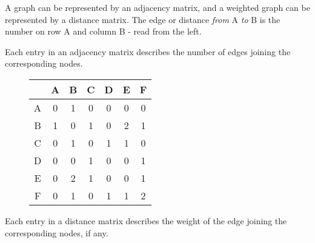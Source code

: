 \documentclass[../main.tex]{subfile}
\begin{document}

A graph can be represented by an adjacency matrix, and a weighted graph can be represented by a distance matrix. The edge or distance \textit{from} A \textit{to} B is the number on row A and column B - read from the left.


Each entry in an adjacency matrix describes the number of edges joining the corresponding nodes.

\begin{figure}[H]
\hspace{0.02\linewidth}
\begin{minipage}{0.48\linewidth}
	\centering
	{\renewcommand{\arraystretch}{1.15}
	\begin{tabular}{c|c c c c c c}
		& A & B & C & D & E & F\\
		\hline
		A & 0 & 1 & 0 & 0 & 0 & 0\\
		B & 1 & 0 & 1 & 0 & 2 & 1\\
		C & 0 & 1 & 0 & 1 & 1 & 0\\
		D & 0 & 0 & 1 & 0 & 0 & 1\\
		E & 0 & 2 & 1 & 0 & 0 & 1\\
		F & 0 & 1 & 0 & 1 & 1 & 2
	\end{tabular}}
\end{minipage}\hfill
\begin{minipage}{0.45\linewidth}
	\vspace{2em}
\end{minipage}
\hspace{0.02\linewidth}
\end{figure}


Each entry in a distance matrix describes the weight of the edge joining the corresponding nodes, if any.
\end{document}
